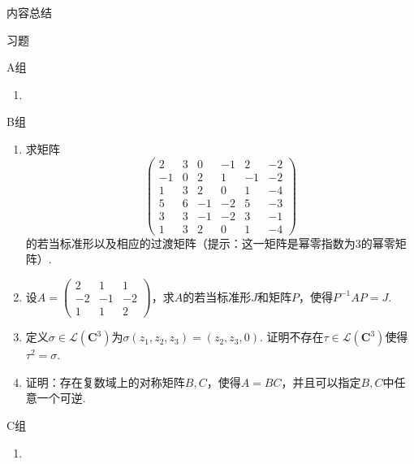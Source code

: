 \vspace{2ex}
\centerline{\heiti \Large 内容总结}

\vspace{2ex}
\centerline{\heiti \Large 习题}

\vspace{2ex}
{\kaishu }
\begin{flushright}
    \kaishu

\end{flushright}

\centerline{\heiti A组}
\begin{enumerate}
    \item
\end{enumerate}

\centerline{\heiti B组}
\begin{enumerate}
    \item 求矩阵\[\begin{pmatrix}
        2 & 3 & 0  & -1 & 2 & -2 \\ -1 & 0 & 2 & 1 & -1 & -2 \\
        1 & 3 & 2  & 0  & 1 & -4 \\ 5 & 6 & -1 & -2 & 5 & -3 \\
        3 & 3 & -1 & -2 & 3 & -1 \\ 1 & 3 & 2 & 0 & 1 & -4
    \end{pmatrix}\]的若当标准形以及相应的过渡矩阵（提示：这一矩阵是幂零指数为3的幂零矩阵）.

    \item 设$A=\begin{pmatrix}
        2 & 1 & 1 \\ -2 & -1 & -2 \\ 1 & 1 & 2
    \end{pmatrix}$，求$A$的若当标准形$J$和矩阵$P$，使得$P^{-1}AP=J$.

    \item 定义$\sigma\in \mathcal{L}(\mathbf{C}^3)$为$\sigma(z_1,z_2,z_3)=(z_2,z_3,0)$. 证明不存在$\tau\in \mathcal{L}(\mathbf{C}^3)$使得$\tau^2=\sigma$.

    \item 证明：存在复数域上的对称矩阵$B,C$，使得$A=BC$，并且可以指定$B,C$中任意一个可逆.
\end{enumerate}

\centerline{\heiti C组}
\begin{enumerate}
    \item
\end{enumerate}
